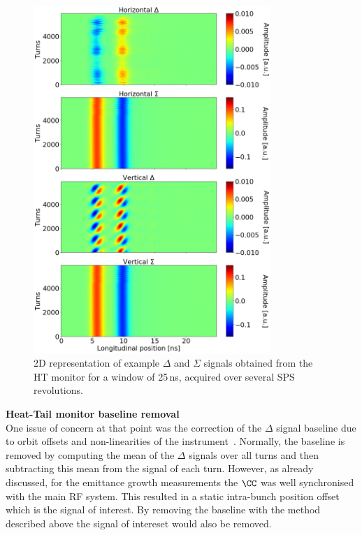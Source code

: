 \begin{figure}[!h]
   \centering         
   \includegraphics[width=0.8\textwidth]{images/Ch4/HT_2D__20180530_114730_colorbar.png}
       \caption{2D representation of example $\Delta$ and $\Sigma$ signals obtained from the HT monitor for a window of 25\,ns, acquired over several SPS revolutions.}
       \label{fig:HT_example_acq_multTurns_2D}
\end{figure}

\newpage
\normalsize{\textbf{Heat-Tail monitor baseline removal}}\\
One issue of concern at that point was the correction of the $\Delta$ signal  baseline due to orbit offsets and non-linearities of the instrument~\cite{Levens:2313358}.  %
Normally, the baseline is removed by computing the mean of the $\Delta$ signals over all turns and then subtracting this mean from the signal of each turn. However, as already discussed, for the emittance growth measurements the $\CC$ was well synchronised with the main RF system. This resulted in a static intra-bunch position offset which is the signal of interest. By removing the baseline with the method described above the signal of intereset would also be removed.


